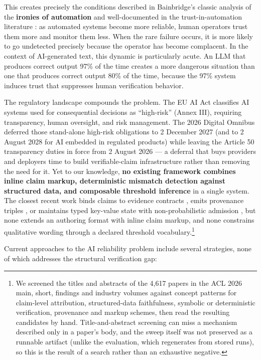 \documentclass[11pt,a4paper]{article}
\begin{document}
This creates precisely the conditions described in Bainbridge's classic analysis of the \textbf{ironies of automation} \citep{bainbridge1983} and well-documented in the trust-in-automation literature \citep{leesee2004, parasuraman1997}: as automated systems become more reliable, human operators trust them more and monitor them less. When the rare failure occurs, it is more likely to go undetected precisely because the operator has become complacent. In the context of AI-generated text, this dynamic is particularly acute. An LLM that produces correct output 97\% of the time creates a more dangerous situation than one that produces correct output 80\% of the time, because the 97\% system induces trust that suppresses human verification behavior.

The regulatory landscape compounds the problem. The EU AI Act \citep{euaiact} classifies AI systems used for consequential decisions as ``high-risk'' (Annex III), requiring transparency, human oversight, and risk management. The 2026 Digital Omnibus \citep{omnibus2026} deferred those stand-alone high-risk obligations to 2 December 2027 (and to 2 August 2028 for AI embedded in regulated products) while leaving the Article 50 transparency duties in force from 2 August 2026 --- a deferral that buys providers and deployers time to build verifiable-claim infrastructure rather than removing the need for it. Yet to our knowledge, \textbf{no existing framework combines inline claim markup, deterministic mismatch detection against structured data, and composable threshold inference} in a single system. The closest recent work binds claims to evidence contracts \citep{gavel}, emits provenance triples \citep{genprove}, or maintains typed key-value state with non-probabilistic admission \citep{toolgate}, but none extends an authoring format with inline claim markup, and none constrains qualitative wording through a declared threshold vocabulary.\footnote{We screened the titles and abstracts of the 4{,}617 papers in the ACL 2026 main, short, findings and industry volumes against concept patterns for claim-level attribution, structured-data faithfulness, symbolic or deterministic verification, provenance and markup schemes, then read the resulting candidates by hand. Title-and-abstract screening can miss a mechanism described only in a paper's body, and the sweep itself was not preserved as a runnable artifact (unlike the evaluation, which regenerates from stored runs), so this is the result of a search rather than an exhaustive negative.}

Current approaches to the AI reliability problem include several strategies, none of which addresses the structural verification gap:
\end{document}

